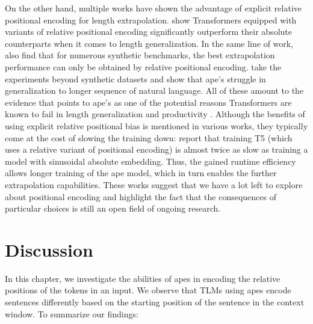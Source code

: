 \documentclass[letterpaper, 12pt]{report}
\begin{document}
On the other hand, multiple works have shown the advantage of explicit relative positional encoding for length extrapolation.
\citet{csordas2021:devil} show Transformers equipped with variants of relative positional encoding \citep{dai-etal-2019-transformer, shaw-etal-2018-self} significantly outperform their absolute counterparts when it comes to length generalization.
In the same line of work, \citet{ontanon2022:compgen} also find that for numerous synthetic benchmarks, the best extrapolation performance can only be obtained by relative positional encoding.
\citet{press2022train} take the experiments beyond synthetic datasets and show that \acrshort{ape}'s struggle in generalization to longer sequence of natural language.
All of these amount to the evidence that points to \acrshort{ape}'s as one of the potential reasons Transformers are known to fail in length generalization and productivity \citep{hupkes2020,Lake2018:SCAN}.
Although the benefits of using explicit relative positional bias is mentioned in various works, they typically come at the cost of slowing the training down: \citep{press2022train} report that training T5 (which uses a relative variant of positional encoding) is almost twice as slow as training a model with sinusoidal absolute embedding. Thus, the gained runtime efficiency allows longer training of the \acrshort{ape} model, which in turn enables the further extrapolation capabilities.
These works suggest that we have a lot left to explore about positional encoding and highlight the fact that the consequences of particular choices is still an open field of ongoing research.



\section{Discussion}
\label{sec:pos_discussion}

In this chapter, we investigate the abilities of \acrshort{ape}s in encoding the relative positions of the tokens in an input. We observe that TLMs using \acrshort{ape}s encode sentences differently based on the starting position of the sentence in the context window. To summarize our findings:
\end{document}
